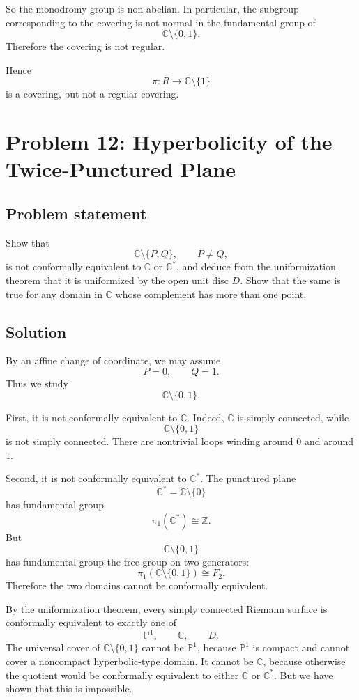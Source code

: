 \documentclass[12pt,a4paper]{article}
\theoremstyle{notespace}
\begin{document}
So the monodromy group is non-abelian. In particular, the subgroup corresponding to the covering is not normal in the fundamental group of
\[
\mathbb C\setminus\{0,1\}.
\]
Therefore the covering is not regular.

Hence
\[
\pi:R\to \mathbb C\setminus\{1\}
\]
is a covering, but not a regular covering.

\section{Problem 12: Hyperbolicity of the Twice-Punctured Plane}

\subsection*{Problem statement}

Show that
\[
\mathbb C\setminus\{P,Q\},
\qquad P\neq Q,
\]
is not conformally equivalent to \(\mathbb C\) or \(\mathbb C^*\), and deduce from the uniformization theorem that it is uniformized by the open unit disc \(D\). Show that the same is true for any domain in \(\mathbb C\) whose complement has more than one point.

\subsection*{Solution}

By an affine change of coordinate, we may assume
\[
P=0,\qquad Q=1.
\]
Thus we study
\[
\mathbb C\setminus\{0,1\}.
\]

First, it is not conformally equivalent to \(\mathbb C\). Indeed, \(\mathbb C\) is simply connected, while
\[
\mathbb C\setminus\{0,1\}
\]
is not simply connected. There are nontrivial loops winding around \(0\) and around \(1\).

Second, it is not conformally equivalent to \(\mathbb C^*\). The punctured plane
\[
\mathbb C^*=\mathbb C\setminus\{0\}
\]
has fundamental group
\[
\pi_1(\mathbb C^*)\cong \mathbb Z.
\]
But
\[
\mathbb C\setminus\{0,1\}
\]
has fundamental group the free group on two generators:
\[
\pi_1(\mathbb C\setminus\{0,1\})\cong F_2.
\]
Therefore the two domains cannot be conformally equivalent.

By the uniformization theorem, every simply connected Riemann surface is conformally equivalent to exactly one of
\[
\mathbb P^1,\qquad \mathbb C,\qquad D.
\]
The universal cover of \(\mathbb C\setminus\{0,1\}\) cannot be \(\mathbb P^1\), because \(\mathbb P^1\) is compact and cannot cover a noncompact hyperbolic-type domain. It cannot be \(\mathbb C\), because otherwise the quotient would be conformally equivalent to either \(\mathbb C\) or \(\mathbb C^*\). But we have shown that this is impossible.
\end{document}
